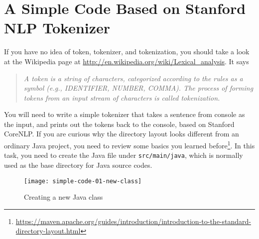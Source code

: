 
\section{A Simple Code Based on Stanford NLP Tokenizer}

If you have no idea of token, tokenizer, and tokenization, you should take a look at the Wikipedia page at \url{http://en.wikipedia.org/wiki/Lexical_analysis}. It says

\begin{quote}
\emph{A token is a string of characters, categorized according to the rules as a symbol (e.g., IDENTIFIER, NUMBER, COMMA). The process of forming tokens from an input stream of characters is called tokenization.}
\end{quote}

You will need to write a simple tokenizer that takes a sentence from console as the input, and prints out the tokens back to the console, based on Stanford CoreNLP. If you are curious why the directory layout looks different from an ordinary Java project, you need to review some basics you learned before\footnote{\url{https://maven.apache.org/guides/introduction/introduction-to-the-standard-directory-layout.html}}. In this task, you need to create the Java file under \texttt{src/main/java}, which is normally used as the base directory for Java source codes.

\begin{figure}
\centering
\texttt{[image: simple-code-01-new-class]}
\caption{Creating a new Java class\label{simple-code-01-new-class}}
\end{figure}

